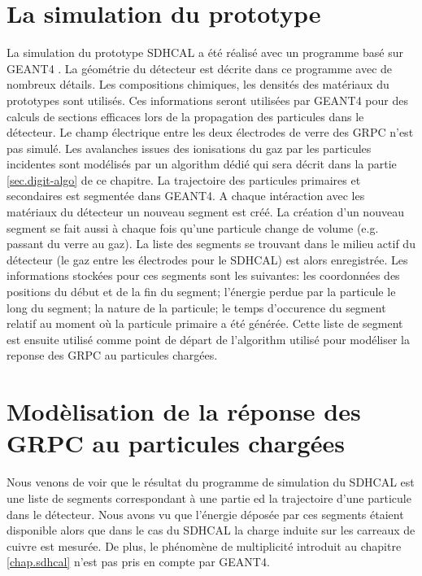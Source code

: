 \section{La simulation du prototype}
La simulation du prototype SDHCAL a été réalisé avec un programme basé sur GEANT4 \cite{geant4}. La géométrie du détecteur est décrite dans ce programme avec de nombreux détails. Les compositions chimiques, les densités des matériaux du prototypes sont utilisés. Ces informations seront utilisées par GEANT4 pour des calculs de sections efficaces lors de la propagation des particules dans le détecteur. Le champ électrique entre les deux électrodes de verre des GRPC n'est pas simulé. Les avalanches issues des ionisations du gaz par les particules incidentes sont modélisés par un algorithm dédié qui sera décrit dans la partie \ref{sec.digit-algo} de ce chapitre. La trajectoire des particules primaires et secondaires est segmentée dans GEANT4. A chaque intéraction avec les matériaux du détecteur un nouveau segment est créé. La création d'un nouveau segment se fait aussi à chaque fois qu'une particule change de volume (e.g. passant du verre au gaz). La liste des segments se trouvant dans le milieu actif du détecteur (le gaz entre les électrodes pour le SDHCAL) est alors enregistrée. Les informations stockées pour ces segments sont les suivantes: les coordonnées des positions du début et de la fin du segment; l'énergie perdue par la particule le long du segment; la nature de la particule; le temps d'occurence du segment relatif au moment où la particule primaire a été générée. 
Cette liste de segment est ensuite utilisé comme point de départ de l'algorithm utilisé pour modéliser la reponse des GRPC au particules chargées.


\section{Modèlisation de la réponse des GRPC au particules chargées}
Nous venons de voir que le résultat du programme de simulation du SDHCAL est une liste de segments correspondant à une partie ed la trajectoire d'une particule dans le détecteur. Nous avons vu que l'énergie déposée par ces segments étaient disponible alors que dans le cas du SDHCAL la charge induite sur les carreaux de cuivre est mesurée. De plus, le phénomène de multiplicité introduit au chapitre \ref{chap.sdhcal} n'est pas pris en compte par GEANT4. 
\label{sec.digit-algo}

